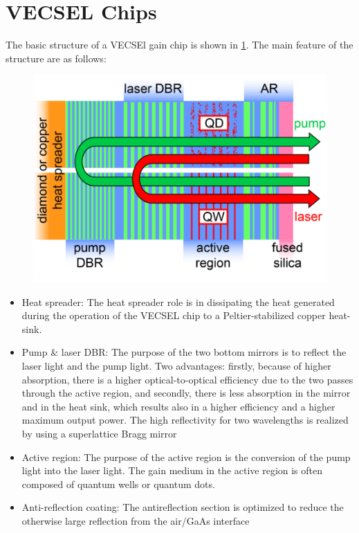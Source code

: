 \section{VECSEL Chips}\label{sec:vecsel}

The basic structure of a VECSEl gain chip is shown in \cref{fig:vecDes}. The main feature of the structure are as follows: 

\begin{figure}[ht]
    \centering
    \includegraphics[width=.8\linewidth]{images/VECSEL_structure.png}
    \caption{}
    \label{fig:vecDes}
\end{figure}

\begin{itemize}
    \item Heat spreader: The heat spreader role is in dissipating the heat generated during the operation of the VECSEL chip to a Peltier-stabilized copper heat-sink.
    \item Pump \& laser  DBR: The purpose of the two bottom mirrors is to reflect the laser light and the pump light. Two advantages: firstly, because of higher absorption, there is a higher optical-to-optical efficiency due to the two passes through the active region, and secondly, there is less absorption in the mirror and in the heat sink, which results also in a higher efficiency and a higher maximum output power. The high reflectivity for two wavelengths is realized by using a superlattice Bragg mirror
    \item Active region: The purpose of the active region is the conversion of the pump light into the laser light. The gain medium in the active region is often composed of quantum wells or quantum dots.
    \item Anti-reflection coating: The antireflection section is optimized to reduce the otherwise large reflection from the air/GaAs interface
\end{itemize}

